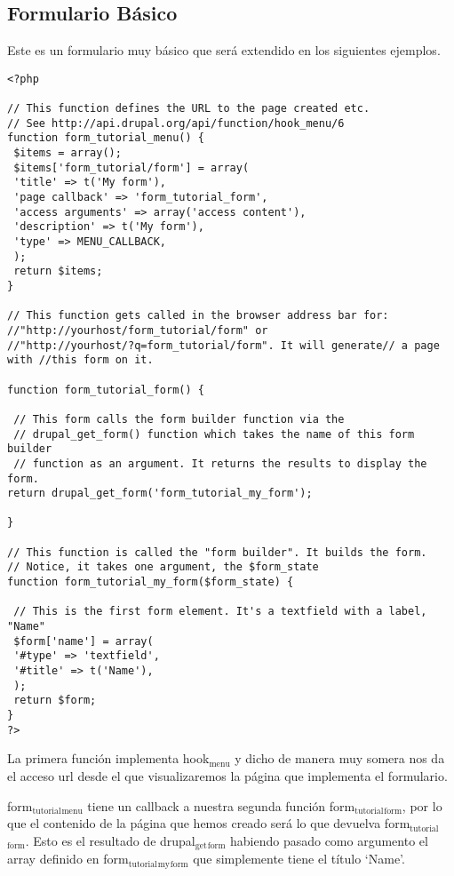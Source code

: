\documentclass[11pt]{article}
\begin{document}
\subsection{Formulario Básico}
\label{sec-4.3}


Este es un formulario muy básico que será extendido en los siguientes
ejemplos.


\begin{verbatim}
<?php

// This function defines the URL to the page created etc.
// See http://api.drupal.org/api/function/hook_menu/6
function form_tutorial_menu() {
 $items = array();
 $items['form_tutorial/form'] = array(
 'title' => t('My form'),
 'page callback' => 'form_tutorial_form',
 'access arguments' => array('access content'),
 'description' => t('My form'),
 'type' => MENU_CALLBACK,
 );
 return $items;
}

// This function gets called in the browser address bar for: 
//"http://yourhost/form_tutorial/form" or 
//"http://yourhost/?q=form_tutorial/form". It will generate// a page with //this form on it.

function form_tutorial_form() {

 // This form calls the form builder function via the
 // drupal_get_form() function which takes the name of this form builder
 // function as an argument. It returns the results to display the form. 
return drupal_get_form('form_tutorial_my_form');

}

// This function is called the "form builder". It builds the form.
// Notice, it takes one argument, the $form_state
function form_tutorial_my_form($form_state) {
 
 // This is the first form element. It's a textfield with a label, "Name"
 $form['name'] = array(
 '#type' => 'textfield',
 '#title' => t('Name'),
 );
 return $form;
}
?>
\end{verbatim}



La primera función implementa hook$_{\mathrm{menu}}$ y dicho de manera muy somera
nos da el acceso url desde el que visualizaremos la página que
implementa el formulario.

form$_{\mathrm{tutorial}}$$_{\mathrm{menu}}$ tiene un callback a nuestra segunda función
form$_{\mathrm{tutorial}}$$_{\mathrm{form}}$, por lo que el contenido de la página que hemos
creado será lo que devuelva form$_{\mathrm{tutorial}}$$_{\mathrm{form}}$. Esto es el resultado
de drupal$_{\mathrm{get}}$$_{\mathrm{form}}$ habiendo pasado como argumento el array definido en
form$_{\mathrm{tutorial}}$$_{\mathrm{my}}$$_{\mathrm{form}}$ que simplemente tiene el título `Name'.
\end{document}
